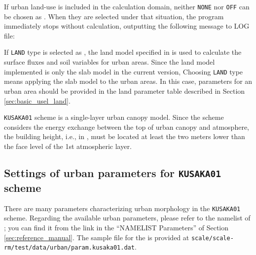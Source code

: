 If urban land-use is included in the calculation domain, neither \verb|NONE| nor \verb|OFF| can be chosen as .
When they are selected under that situation, the program immediately stops without calculation, outputting the following message to LOG file:
%

If \verb|LAND| type is selected as ,
the land model specified in  is used to calculate the surface fluxes and soil variables for urban areas.
Since the land model implemented is only the slab model in the current version,
Choosing \verb|LAND| type means applying the slab model to the urban areas.
In this case, parameters for an urban area should be provided in the land parameter table described in Section \ref{sec:basic_usel_land}.


\verb|KUSAKA01| scheme is a single-layer urban canopy model.
Since the scheme considers the energy exchange between the top of urban canopy and atmosphere,
the building height, i.e.,  in , must be located at least the two meters lower than the face level of the 1st atmospheric layer.



\subsection{Settings of urban parameters for \texttt{KUSAKA01} scheme}

There are many parameters characterizing urban morphology in the \verb|KUSAKA01| scheme.
Regarding the available urban parameters,
please refer to the namelist of ;
you can find it from the link in the ``NAMELIST Parameters'' of Section \ref{sec:reference_manual}.
The sample file for the  is provided at \verb|scale/scale-rm/test/data/urban/param.kusaka01.dat|.


